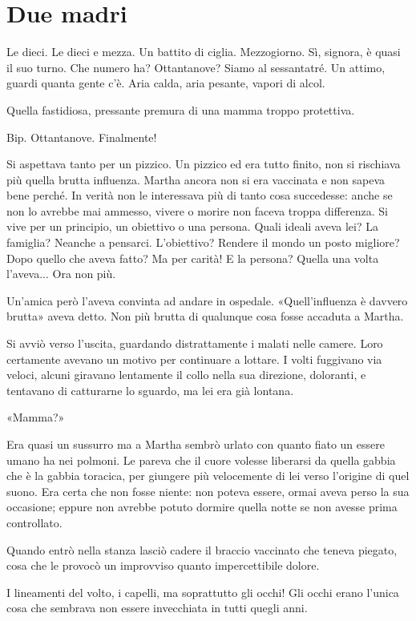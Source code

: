 \chapter{Due madri}
\label{ch:due-madri}

Le dieci. Le dieci e mezza. Un battito di ciglia. Mezzogiorno. Sì, signora, è quasi il suo turno.
Che numero ha? Ottantanove? Siamo al sessantatré. Un attimo, guardi quanta gente c’è. Aria calda,
aria pesante, vapori di alcol.

Quella fastidiosa, pressante premura di una mamma troppo protettiva.

Bip. Ottantanove. Finalmente!

Si aspettava tanto per un pizzico. Un pizzico ed era tutto finito, non si rischiava più quella
brutta influenza. Martha ancora non si era vaccinata e non sapeva bene perché. In verità non le
interessava più di tanto cosa succedesse: anche se non lo avrebbe mai ammesso, vivere o morire non
faceva troppa differenza. Si vive per un principio, un obiettivo o una persona. Quali ideali aveva
lei? La famiglia? Neanche a pensarci. L’obiettivo? Rendere il mondo un posto migliore? Dopo quello
che aveva fatto? Ma per carità! E la persona? Quella una volta l’aveva... Ora non più.

Un’amica però l’aveva convinta ad andare in ospedale. «Quell’influenza è davvero brutta» aveva
detto. Non più brutta di qualunque cosa fosse accaduta a Martha.

Si avviò verso l’uscita, guardando distrattamente i malati nelle camere. Loro certamente avevano un
motivo per continuare a lottare. I volti fuggivano via veloci, alcuni giravano lentamente il collo
nella sua direzione, doloranti, e tentavano di catturarne lo sguardo, ma lei era già lontana.

«Mamma?»

Era quasi un sussurro ma a Martha sembrò urlato con quanto fiato un essere umano ha nei polmoni. Le
pareva che il cuore volesse liberarsi da quella gabbia che è la gabbia toracica, per giungere più
velocemente di lei verso l’origine di quel suono. Era certa che non fosse niente: non poteva essere,
ormai aveva perso la sua occasione; eppure non avrebbe potuto dormire quella notte se non avesse
prima controllato.

Quando entrò nella stanza lasciò cadere il braccio vaccinato che teneva piegato, cosa che le provocò
un improvviso quanto impercettibile dolore.

I lineamenti del volto, i capelli, ma soprattutto gli occhi! Gli occhi erano l’unica cosa che
sembrava non essere invecchiata in tutti quegli anni.

